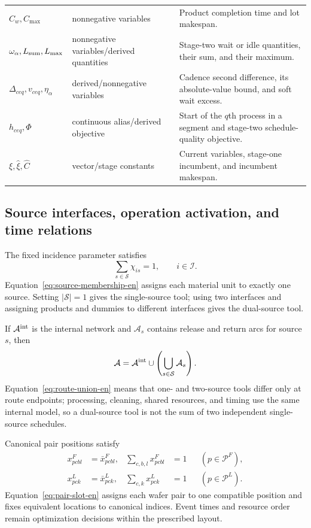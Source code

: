 \documentclass[journal]{IEEEtran}
\begin{document}
\begin{table}[t]
\begin{tabular}{C{0.18\textwidth}C{0.15\textwidth}C{0.47\textwidth}}
$C_w,C_{\max}$ & nonnegative variables & Product completion time and lot makespan.\\
$\omega_\alpha,L_{\rm sum},L_{\max}$ & nonnegative variables/derived quantities & Stage-two wait or idle quantities, their sum, and their maximum.\\
$\Delta_{ceq},v_{ceq},\eta_\alpha$ & derived/nonnegative variables & Cadence second difference, its absolute-value bound, and soft wait excess.\\
$h_{ceq},\Phi$ & continuous alias/derived objective & Start of the $q$th process in a segment and stage-two schedule-quality objective.\\
$\xi,\widehat\xi,\widehat C$ & vector/stage constants & Current variables, stage-one incumbent, and incumbent makespan.\\
\bottomrule
\end{tabular}
\end{table}

\subsection{Source interfaces, operation activation, and time relations}

The fixed incidence parameter satisfies
\begin{equation}
\sum_{s\in\mathcal S}\chi_{is}=1,
\qquad i\in\mathcal I.
\label{eq:source-membership-en}
\end{equation}
Equation~\eqref{eq:source-membership-en} assigns each material unit to exactly one source. Setting $|\mathcal S|=1$ gives the single-source tool; using two interfaces and assigning products and dummies to different interfaces gives the dual-source tool.

If $\mathcal A^{\rm int}$ is the internal network and $\mathcal A_s$ contains release and return arcs for source $s$, then
\begin{equation}
\mathcal A=\mathcal A^{\rm int}\cup
\left(\bigcup_{s\in\mathcal S}\mathcal A_s\right).
\label{eq:route-union-en}
\end{equation}
Equation~\eqref{eq:route-union-en} means that one- and two-source tools differ only at route endpoints; processing, cleaning, shared resources, and timing use the same internal model, so a dual-source tool is not the sum of two independent single-source schedules.

Canonical pair positions satisfy
\begin{equation}
\begin{aligned}
x^F_{pcbl}&=\bar x^F_{pcbl}, &
\sum_{c,b,l}x^F_{pcbl}&=1 &&(p\in\mathcal P^F),\\
x^L_{pck}&=\bar x^L_{pck}, &
\sum_{c,k}x^L_{pck}&=1 &&(p\in\mathcal P^L).
\end{aligned}
\label{eq:pair-slot-en}
\end{equation}
Equation~\eqref{eq:pair-slot-en} assigns each wafer pair to one compatible position and fixes equivalent locations to canonical indices. Event times and resource order remain optimization decisions within the prescribed layout.
\end{document}

